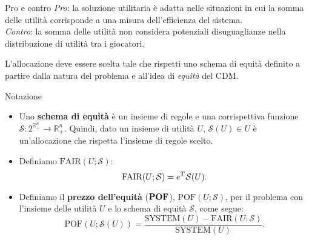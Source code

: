 \documentclass{beamer}
\begin{document}
\begin{frame}
	\begin{block}{Pro e contro}
		\textit{Pro}: la soluzione utilitaria è adatta nelle situazioni in cui la somma delle utilità corrisponde a una misura dell'efficienza del sistema.\\
		\textit{Contro}: la somma delle utilità non considera potenziali disuguaglianze nella distribuzione di utilità tra i giocatori.
	\end{block}
	L'allocazione deve essere scelta tale che rispetti uno schema di equità definito a partire dalla natura del problema e all'idea di \textit{equità} del CDM.
\end{frame}

\begin{frame}
	\begin{block}{Notazione}
		\begin{itemize}
		\item Uno \textbf{schema di equità} è un insieme di regole e una corrispettiva funzione $\mathcal{S}: 2^{\mathbb{R}^{n}_{+}} \rightarrow \mathbb{R}^{n}_{+}$. Quindi, dato un insieme di utilità $U$, $\mathcal{S}(U) \in U$ è un'allocazione che rispetta l'insieme di regole scelto.\\
		\item Definiamo $\text{FAIR}(U; \mathcal{S})$:
		\vspace{-0.3cm}
		\begin{equation}
			\text{FAIR}(U; \mathcal{S}) = e^T \mathcal{S}(U).
			\vspace{-0.3cm}
		\end{equation}
		\item Definiamo il \textbf{prezzo dell'equità} ($\text{\textbf{POF}}$), $\text{POF}(U; \mathcal{S})$, per il problema con l'insieme delle utilità $U$ e lo schema di equità $\mathcal{S}$, come segue:
		\vspace{-0.3cm}
			\begin{equation}
				\text{POF}(U;\mathcal{S}(U)) = \frac{\text{SYSTEM}(U) - \text{FAIR}(U;\mathcal{S})}{\text{SYSTEM}(U)}.
			\end{equation}
		\end{itemize}
		\vspace{-0.2cm}
	\end{block}
\end{frame}
\end{document}
